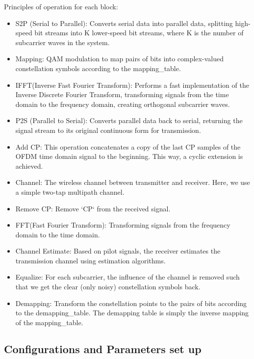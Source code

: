 Principles of operation for each block:
\begin{itemize}
    \item S2P (Serial to Parallel): Converts serial data into parallel data, splitting high-speed bit streams into K lower-speed bit streams, where K is the number of subcarrier waves in the system.
    \item Mapping: QAM modulation to map pairs of bits into complex-valued constellation symbols according to the mapping\_table.
    \item IFFT(Inverse Fast Fourier Transform): Performs a fast implementation of the Inverse Discrete Fourier Transform, transforming signals from the time domain to the frequency domain, creating orthogonal subcarrier waves.
    \item P2S (Parallel to Serial): Converts parallel data back to serial, returning the signal stream to its original continuous form for transmission.
    \item Add CP:  This operation concatenates a copy of the last CP samples of the OFDM time domain signal to the beginning. This way, a cyclic extension is achieved.
    \item Channel: The wireless channel between transmitter and receiver. Here, we use a simple two-tap multipath channel.
    \item Remove CP: Remove `CP` from the received signal.
    \item FFT(Fast Fourier Transform): Transforming signals from the frequency domain to the time domain.
    \item Channel Estimate: Based on pilot signals, the receiver estimates the transmission channel using estimation algorithms.
    \item Equalize: For each subcarrier, the influence of the channel is removed such that we get the clear (only noisy) constellation symbols back.
    \item Demapping: Transform the constellation points to the pairs of bits according to the demapping\_table. The demapping table is simply the inverse mapping of the mapping\_table.
\end{itemize}

\subsection{Configurations and Parameters set up}

